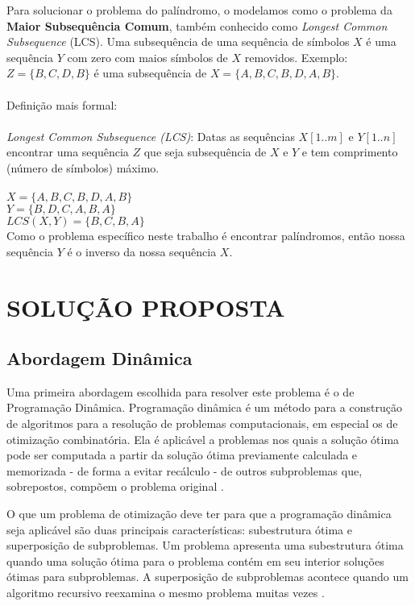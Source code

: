 \documentclass[12pt]{article}
\begin{document}
	Para solucionar o problema do palíndromo, o modelamos como o problema da \textbf{Maior Subsequência Comum}, também conhecido como \textit{Longest Common Subsequence} (LCS). Uma subsequência de uma sequência de símbolos $X$ é uma sequência $Y$ com zero com maios símbolos de $X$ removidos. Exemplo: $Z = \{B, C, D, B\}$ é uma subsequência de $X = \{A, B, C, B, D, A, B\}$.
	\\
	\\
	Definição mais formal:\\
	\\
	\textit{Longest Common Subsequence (LCS)}: Datas as sequências $X [1..m]$ e $Y [1..n]$ encontrar uma sequência $Z$ que seja subsequência de $X$ e $Y$ e tem comprimento (número de símbolos) máximo.\\
	\\
	$X = \{A, B, C, B, D, A, B\}$\\
	$Y = \{B, D, C, A, B, A\}$\\
	$LCS (X,Y) = \{B, C, B, A\}$\\

	Como o problema específico neste trabalho é encontrar palíndromos, então nossa sequência $Y$ é o inverso da nossa sequência $X$.

\section{SOLUÇÃO PROPOSTA}
\label{solucao_proposta}

\subsection{Abordagem Dinâmica}
\label{dinamica}

    Uma primeira abordagem escolhida para resolver este problema é o de Programação Dinâmica. Programação dinâmica é um método para a construção de algoritmos para a resolução de problemas computacionais, em especial os de otimização combinatória. Ela é aplicável a problemas nos quais a solução ótima pode ser computada a partir da solução ótima previamente calculada e memorizada - de forma a evitar recálculo - de outros subproblemas que, sobrepostos, compõem o problema original \cite{szwarccfiter}.

    O que um problema de otimização deve ter para que a programação dinâmica seja aplicável são duas principais características: subestrutura ótima e superposição de subproblemas. Um problema apresenta uma subestrutura ótima quando uma solução ótima para o problema contém em seu interior soluções ótimas para subproblemas. A superposição de subproblemas acontece quando um algoritmo recursivo reexamina o mesmo problema muitas vezes \cite{szwarccfiter}.
\end{document}
